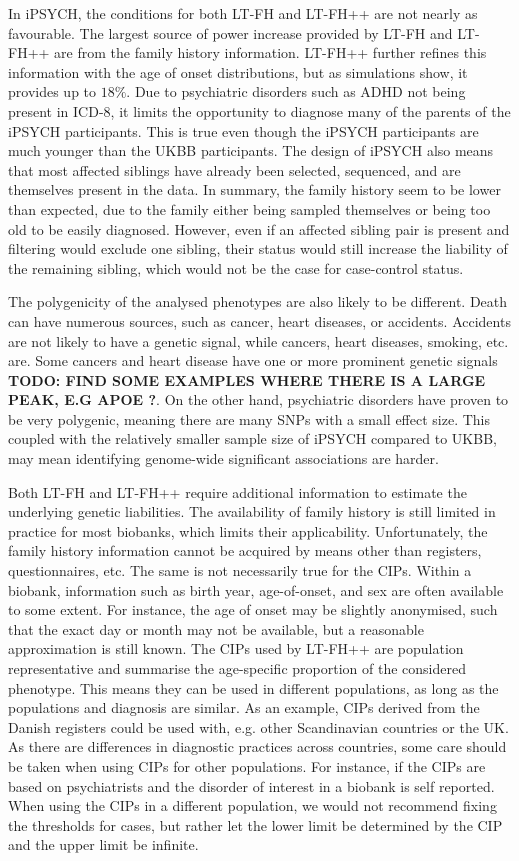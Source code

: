In iPSYCH, the conditions for both LT-FH and LT-FH++ are not nearly as favourable. The largest source of power increase provided by LT-FH and LT-FH++ are from the family history information. LT-FH++ further refines this information with the age of onset distributions, but as simulations show, it provides up to $ 18\% $. Due to psychiatric disorders such as ADHD not being present in ICD-8, it limits the opportunity to diagnose many of the parents of the iPSYCH participants. This is true even though the iPSYCH participants are much younger than the UKBB participants. The design of iPSYCH also means that most affected siblings have already been selected, sequenced, and are themselves present in the data. In summary, the family history seem to be lower than expected, due to the family either being sampled themselves or being too old to be easily diagnosed. However, even if an affected sibling pair is present and filtering would exclude one sibling, their status would still increase the liability of the remaining sibling, which would not be the case for case-control status.

The polygenicity of the analysed phenotypes are also likely to be different. Death can have numerous sources, such as cancer, heart diseases, or accidents. Accidents are not likely to have a genetic signal, while cancers, heart diseases, smoking, etc. are. Some cancers and heart disease have one or more prominent genetic signals \textbf{TODO: FIND SOME EXAMPLES WHERE THERE IS A LARGE PEAK, E.G APOE ?}. On the other hand, psychiatric disorders have proven to be very polygenic, meaning there are many SNPs with a small effect size. This coupled with the relatively smaller sample size of iPSYCH compared to UKBB, may mean identifying genome-wide significant associations are harder.

Both LT-FH and LT-FH++ require additional information to estimate the underlying genetic liabilities. The availability of family history is still limited in practice for most biobanks, which limits their applicability. Unfortunately, the family history information cannot be acquired by means other than registers, questionnaires, etc. The same is not necessarily true for the CIPs. Within a biobank, information such as birth year, age-of-onset, and sex are often available to some extent. For instance, the age of onset may be slightly anonymised, such that the exact day or month may not be available, but a reasonable approximation is still known. The CIPs used by LT-FH++ are population representative and summarise the age-specific proportion of the considered phenotype. This means they can be used in different populations, as long as the populations and diagnosis are similar. As an example, CIPs derived from the Danish registers could be used with, e.g. other Scandinavian countries or the UK. As there are differences in diagnostic practices across countries, some care should be taken when using CIPs for other populations. For instance, if the CIPs are based on psychiatrists and the disorder of interest in a biobank is self reported. When using the CIPs in a different population, we would not recommend fixing the thresholds for cases, but rather let the lower limit be determined by the CIP and the upper limit be infinite. 